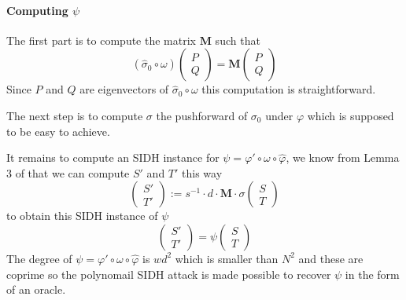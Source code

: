 \documentclass[12pt,a4paper]{article}
\begin{document}
		\paragraph{Computing $\psi$}

		The first part is to compute the matrix $\mathbf M$ such that \[
			(\widehat\sigma_0\circ \omega) \begin{pmatrix} P \\
				Q \end{pmatrix} = \mathbf M \begin{pmatrix} P \\ Q \end{pmatrix} \] 
				Since $P$ and $Q$ are eigenvectors of $\widehat\sigma_0\circ\omega$ this computation is
				straightforward.


				The next step is to compute $\sigma$ the pushforward of $\sigma_0$ under $\varphi$ which
				is supposed to be easy to achieve.

				It remains to compute an SIDH instance for $\psi=\varphi'\circ\omega\circ\widehat\varphi$, we
				know from Lemma 3 of \cite{polyCIST} that we can compute $S'$ and $T'$ this way \[
					\begin{pmatrix} S' \\ T' \end{pmatrix} := s^{-1}\cdot d\cdot\mathbf M\cdot\sigma\begin{pmatrix} S \\ T \end{pmatrix} 
					\] to obtain this SIDH instance of $\psi$ \[
					\begin{pmatrix} S' \\ T' \end{pmatrix} = \psi\begin{pmatrix} S \\ T \end{pmatrix} 
				\]
				The degree of $\psi=\varphi'\circ\omega\circ\widehat\varphi$ is $wd^2$ which is smaller than
				$N^2$ and these are coprime so the polynomail SIDH attack is made possible to recover $\psi$ in
				the form of an oracle.
\end{document}
